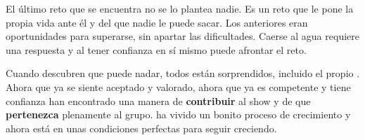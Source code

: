 El último reto que se encuentra no se lo plantea nadie. 
%
Es un reto que le pone la propia vida ante él y del que nadie le puede sacar.
%
Los anteriores eran oportunidades para superarse, sin apartar las dificultades. 
%
Caerse al agua requiere una respuesta y al tener confianza en sí mismo puede afrontar el reto.

Cuando descubren que puede nadar, todos están sorprendidos, incluido el propio \nick.
%
Ahora que ya se siente aceptado y valorado, ahora que ya es competente y tiene confianza han encontrado una manera de \textbf{contribuir} al show y de que \nick \textbf{pertenezca} plenamente al grupo.
%
\nick ha vivido un bonito proceso de crecimiento y ahora está en unas condiciones perfectas para seguir creciendo.
